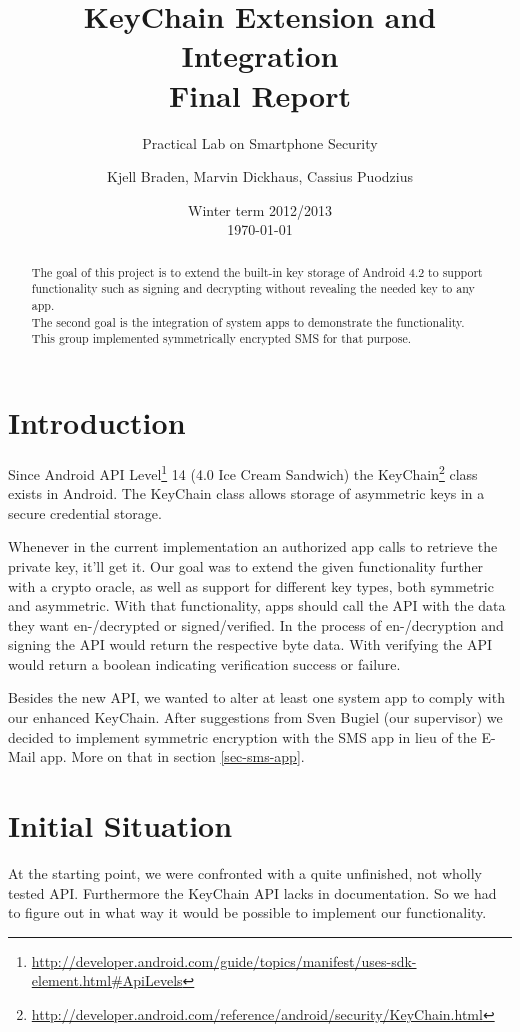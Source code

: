 \documentclass[a4paper,draft]{scrartcl}
\title{KeyChain Extension and Integration\\
	Final Report}
\subtitle{Practical Lab on Smartphone Security}
\author{Kjell Braden, Marvin Dickhaus, Cassius Puodzius}
\date{Winter term 2012/2013\\\today}
\begin{document}
\maketitle

\begin{abstract}
	The goal of this project is to extend the built-in key storage of Android 4.2 to support functionality such as signing and decrypting without revealing the needed key to any app.\\
	The second goal is the integration of system apps to demonstrate the functionality. This group implemented symmetrically encrypted SMS for that purpose.
\end{abstract}

\tableofcontents
\pagebreak[4]

\section{Introduction}
	Since Android API Level\footnote{\url{http://developer.android.com/guide/topics/manifest/uses-sdk-element.html\#ApiLevels}} 14 (4.0 Ice Cream Sandwich) the KeyChain\footnote{\url{http://developer.android.com/reference/android/security/KeyChain.html}} class exists in Android. The KeyChain class allows storage of asymmetric keys in a secure credential storage.

	Whenever in the current implementation an authorized app calls to retrieve the private key, it'll get it. Our goal was to extend the given functionality further with a crypto oracle, as well as support for different key types, both symmetric and asymmetric. With that functionality, apps should call the API with the data they want en-/decrypted or signed/verified. In the process of en-/decryption and signing the API would return the respective byte data. With verifying the API would return a boolean indicating verification success or failure.
	
	Besides the new API, we wanted to alter at least one system app to comply with our enhanced KeyChain. After suggestions from Sven Bugiel (our supervisor) we decided to implement symmetric encryption with the SMS app in lieu of the E-Mail app. More on that in section \ref{sec-sms-app}.

\section{Initial Situation}
	At the starting point, we were confronted with a quite unfinished, not wholly tested API. Furthermore the KeyChain API lacks in documentation. So we had to figure out in what way it would be possible to implement our functionality.
\end{document}
